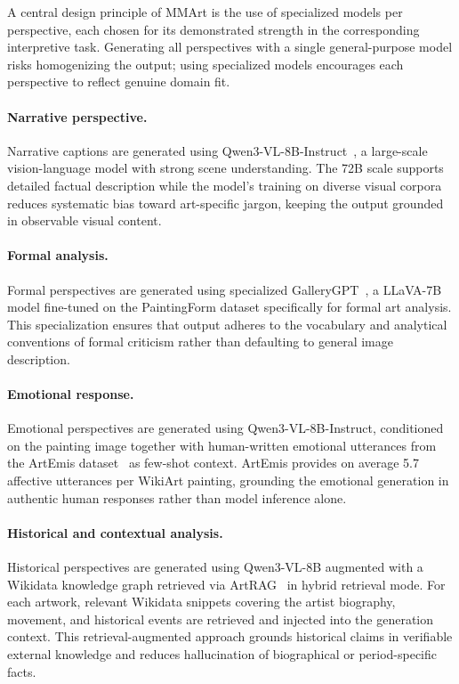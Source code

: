 A central design principle of MMArt is the use of specialized models per perspective, each chosen for its demonstrated strength in the corresponding interpretive task.
Generating all perspectives with a single general-purpose model risks homogenizing the output; using specialized models encourages each perspective to reflect genuine domain fit.

\paragraph{Narrative perspective.}
Narrative captions are generated using Qwen3-VL-8B-Instruct~\cite{bai2025qwen3vltechnicalreport}, a large-scale vision-language model with strong scene understanding.
The 72B scale supports detailed factual description while the model's training on diverse visual corpora reduces systematic bias toward art-specific jargon, keeping the output grounded in observable visual content.

\paragraph{Formal analysis.}
Formal perspectives are generated using specialized GalleryGPT~\cite{MM24GalleryGPT}, a LLaVA-7B model fine-tuned on the PaintingForm dataset specifically for formal art analysis. This specialization ensures that output adheres to the vocabulary and analytical conventions of formal criticism rather than defaulting to general image description.

\paragraph{Emotional response.}
Emotional perspectives are generated using Qwen3-VL-8B-Instruct, conditioned on the painting image together with human-written emotional utterances from the ArtEmis dataset~\cite{achlioptas2021artemis} as few-shot context.
ArtEmis provides on average 5.7 affective utterances per WikiArt painting, grounding the emotional generation in authentic human responses rather than model inference alone.

\paragraph{Historical and contextual analysis.}
Historical perspectives are generated using Qwen3-VL-8B augmented with a Wikidata knowledge graph retrieved via ArtRAG~\cite{ArtRAG_MM2025} in hybrid retrieval mode.
For each artwork, relevant Wikidata snippets covering the artist biography, movement, and historical events are retrieved and injected into the generation context.
This retrieval-augmented approach grounds historical claims in verifiable external knowledge and reduces hallucination of biographical or period-specific facts.

